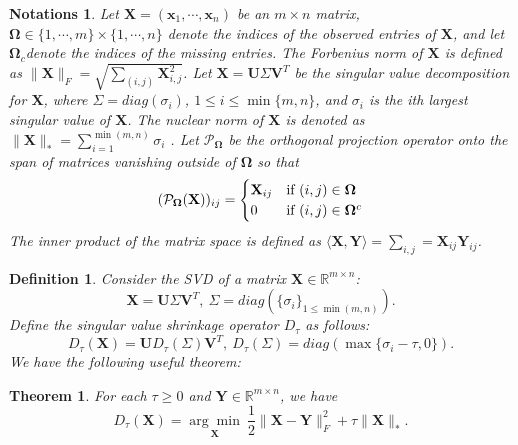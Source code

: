 \documentclass{article}
\newtheorem{definition}{Definition}[section]
\newtheorem{theorem}{Theorem}[section]
\newtheorem{notations}{Notations}
\begin{document}
{\begin{notations}
    Let $\mathbf X = (\mathbf x_1,\cdots,\mathbf x_n)$ be an $m \times n$ matrix, $\mathbf \Omega \in \{1,\cdots,m\}\times\{1,\cdots,n\}$ denote the indices of the observed
    entries of $\mathbf X$, and let $\mathbf \Omega_c$denote the indices of the missing entries. The Forbenius norm of $\mathbf X$ is defined as $\lVert\mathbf X \rVert_F = \sqrt{\sum_{(i,j)} \mathbf X^2_{i,j}}$. Let $\mathbf X=\mathbf U\mathbf \varSigma \mathbf V^T$ be the singular value decomposition for $\mathbf X$, where $\varSigma = diag(\sigma_i)$, $1 \leq i\leq \min\{m,n\}$, and $\sigma_i$ is the ith largest singular value of $\mathbf X$. The nuclear norm of $\mathbf X$ is denoted as $\lVert\mathbf X \rVert_* = \sum_{i=1}^{\min(m,n)} \sigma_i$ . Let $\mathcal{P}_{\mathbf \Omega}$ be the orthogonal projection operator onto the span of matrices vanishing outside of $\mathbf \Omega$ so that
    \begin{equation*}
        (\mathcal{P}_{\mathbf \Omega}(\mathbf X))_{ij} = \begin{cases}
            \mathbf X_{ij} & \text{\rm if } (i,j) \in \mathbf \Omega\\
        0 & \text{\rm if } (i,j) \in \mathbf \Omega^c
    \end{cases}
    \end{equation*}
    The  inner product of the matrix space is defined as $ \langle \mathbf X,\mathbf Y\rangle = \sum_{i,j} = \mathbf X_{ij}\mathbf Y_{ij}$.
\end{notations}

\begin{definition}
    Consider the SVD of a matrix $\mathbf X \in \mathbb{R}^{m \times n}$:
    \begin{equation}
        \mathbf X = \mathbf U \mathbf \varSigma \mathbf V^T, \ \mathbf \varSigma = diag(\{\sigma_i\}_{1 \leq \min(m,n)}).
    \end{equation}
    Define the singular value shrinkage operator $D_{\tau}$ as follows:
    \begin{equation}
        D_{\tau}(\mathbf X) = \mathbf U D_{\tau}(\mathbf \varSigma) \mathbf V^T, \ D_{\tau}(\mathbf \varSigma) = diag(\max\{\sigma_i-\tau,0\}).
    \end{equation}
    We have the following useful theorem:	
\end{definition}

\begin{theorem}
    For each $\tau \geq 0$ and $\mathbf Y \in \mathbb{R}^{m \times n}$, we have
    \begin{equation}
        D_{\tau}(\mathbf X) = \underset{\mathbf X}{\arg\min}\  \frac{1}{2} \lVert \mathbf X-\mathbf Y\rVert_F^2 + \tau \lVert\mathbf X \lVert_*.
    \end{equation} 
    \label{thm32}
\end{theorem}

}
\end{document}
